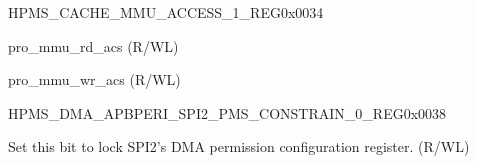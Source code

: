 \begin{register}{H}{PMS\_CACHE\_MMU\_ACCESS\_1\_REG}{0x0034}\label{regdesc:PMSCACHEMMUACCESS1REG}
%
%
%
\regnewline%
\begin{regdesc}\begin{reglist}
\label{fielddesc:PMSPROMMURDACS}\item [PMS\_PRO\_MMU\_RD\_ACS] pro\_mmu\_rd\_acs (R/WL)
\label{fielddesc:PMSPROMMUWRACS}\item [PMS\_PRO\_MMU\_WR\_ACS] pro\_mmu\_wr\_acs (R/WL)
\end{reglist}\end{regdesc}
\end{register}


\begin{register}{H}{PMS\_DMA\_APBPERI\_SPI2\_PMS\_CONSTRAIN\_0\_REG}{0x0038}\label{regdesc:PMSDMAAPBPERISPI2PMSCONSTRAIN0REG}
%
%
\regnewline%
\begin{regdesc}\begin{reglist}
\label{fielddesc:PMSDMAAPBPERISPI2PMSCONSTRAINLOCK}\item [PMS\_DMA\_APBPERI\_SPI2\_PMS\_CONSTRAIN\_LOCK]Set this bit to lock SPI2's DMA permission configuration register. (R/WL)
\end{reglist}\end{regdesc}
\end{register}


